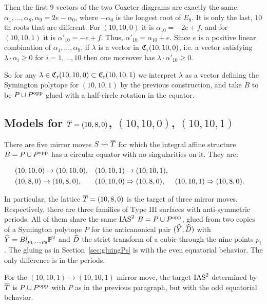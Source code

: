 \documentclass{amsart}
\begin{document}
Then the first $9$ vectors of the two Coxeter diagrams are exactly the
same: $\alpha_1, \dotsc, \alpha_8, \alpha_9=2e-\alpha_0$, where
$-\alpha_0$ is the longest root of $E_8$.
It is only the last, $10$th roots that are different. For $(10,10,0)$
it is $\alpha_{10}=-2e+f$, and for $(10,10,1)$ it is
$\alpha'_{10} = -e+f$. Thus, $\alpha'_{10} = \alpha_{10} + e$. Since
$e$ is a positive linear combination of $\alpha_1,\dotsc,\alpha_9$, if
$\lambda$ is a vector in ${\mathfrak C}_{\rm r}(10,10,0)$, i.e. a vector satisfying
$\lambda\cdot \alpha_i\ge0$ for $i=1,\dotsc, 10$ then one moreover has
$\lambda\cdot \alpha'_{10}\ge 0$.

\smallskip

So for any $\lambda\in{\mathfrak C}_{\rm r}(10,10,0) \subset {\mathfrak C}_{\rm r}(10,10,1)$ we interpret
$\lambda$ as a vector defining the Symington polytope for $(10,10,1)$
by the previous construction, and take $B$ to be $P\cup P^{\rm opp}$ glued
with a half-circle rotation in the equator. 


\subsection{Models for ${\overline T}=(10,8,0)$, $(10,10,0)$, $(10,10,1)$}
\label{sec:models-res}

There are five mirror moves $S\leadsto {\overline T}$ for which the integral
affine structure $B=P\cup P^{\rm opp}$ has a circular
equator with no singularities on it. They are:

\begin{align}\label{circles}\begin{aligned} &(10,10,0)\to (10,10,0), && (10,10,1)\to (10,10,1), \\
&(10,8,0)\to (10,8,0), && (10,10,0)\Rightarrow (10,8,0), && (10,10,1)\Rightarrow (10,8,0).
\end{aligned} \end{align} 

In particular, the lattice ${\overline T}=(10,8,0)$ is the target of three mirror moves.
Respectively, there are three families of Type III
surfaces with anti-symmetric periods.
All of them share the same $\operatorname{IAS}^2$ $B=P\cup P^{\rm opp}$, glued from two
copies of a Symington polytope $P$ for the anticanonical pair
$({\widehat Y},{\widehat D})$ with ${\widehat Y}=Bl_{p_1,\dots,p_9}{\mathbb P}^2$ and ${\widehat D}$ the strict
transform of a cubic through the nine points $p_i$. The gluing as in
Section~\ref{sec:gluingPs} is with the even equatorial behavior.
The only difference is in the periods.

For the $(10,10,1)\to (10,10,1)$
mirror move, the target $\operatorname{IAS}^2$ determined by ${\overline T}$ is $P\cup P^{\rm opp}$
with $P$ as in the previous paragraph, but with the odd equatorial behavior.
\end{document}
